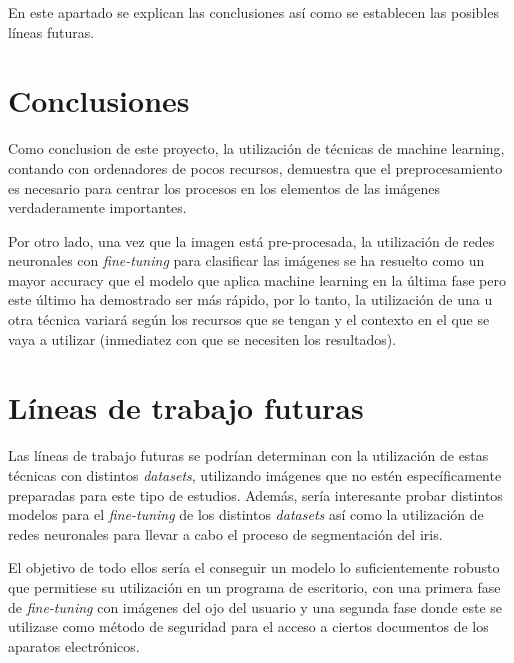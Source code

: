  \label{capitulo7}

En este apartado se explican las conclusiones así como se establecen las posibles líneas futuras.

\section{Conclusiones}
Como conclusion de este proyecto, la utilización de técnicas de machine learning, contando con ordenadores de pocos recursos, demuestra que el preprocesamiento
es necesario para centrar los procesos en los elementos de las imágenes verdaderamente importantes. 

Por otro lado, una vez que la imagen está pre-procesada, la utilización 
de redes neuronales con \textit{fine-tuning} para clasificar las imágenes se ha resuelto como un mayor accuracy que el modelo que aplica machine learning en la última fase
pero este último ha demostrado ser más rápido, por lo tanto, la utilización de una u otra técnica variará según los recursos que se tengan y el contexto en el que se 
vaya a utilizar (inmediatez con que se necesiten los resultados).


\section{Líneas de trabajo futuras}

Las líneas de trabajo futuras se podrían determinan con la utilización de estas técnicas con distintos \textit{datasets}, utilizando imágenes que no estén específicamente preparadas
para este tipo de estudios. Además, sería interesante probar distintos modelos para el \textit{fine-tuning} de los distintos \textit{datasets} así como la utilización de redes neuronales
para llevar a cabo el proceso de segmentación del iris.

El objetivo de todo ellos sería el conseguir un modelo lo suficientemente robusto
que permitiese su utilización en un programa de escritorio, con una primera fase de \textit{fine-tuning} con imágenes del ojo del usuario y una segunda fase donde este 
se utilizase como método de seguridad para el acceso a ciertos documentos de los aparatos electrónicos.